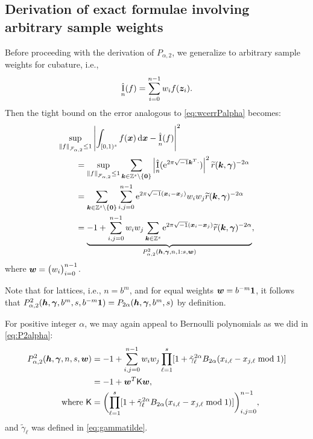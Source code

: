 \documentclass[authoryear]{elsarticle}
\newcommand{\tr}{\widetilde{r}}
\newcommand{\appxintn}{\appxint_n}
\DeclareMathOperator{\appxint}{\hat{I}}
\begin{document}
\subsection{Derivation of exact formulae involving arbitrary sample weights}
Before proceeding with the derivation of $P_{\alpha,2}$, we generalize to arbitrary sample weights for cubature, i.e., 
\[
\appxintn(f) =  \sum_{i=0}^{n-1} w_if(\vz_i).
\]
Then the tight bound on the error analogous to \eqref{eq:wcerrPalpha} becomes: 
\begin{align*}
\nonumber
\MoveEqLeft{\sup_{\norm[\cf_{\alpha,2}]{f} \le 1} \abs{\int_{[0,1)^{s}} f(\vx) \, \dif \vx - \appxint_n(f)}^2} \\
& = \sup_{\norm[\cf_{\alpha,2}]{f} \le 1} \sum_{\vk \in \integers^s \setminus\{\vzero\}} \abs{\appxint_n(\me^{2 \pi \sqrt{-1} \vk^T \cdot})}^2\tr(\vk,\vgamma)^{-2\alpha} \\
&=\sum_{\vk \in \integers^s \setminus\{\vzero\}} \sum_{i,j = 0}^{n-1} \me^{2 \pi \sqrt{-1} (\vx_i - \vx_j)} w_i w_j \tr(\vk,\vgamma)^{-2\alpha} \\
&= \underbrace{ -1 + \sum_{i,j = 0}^{n-1} w_i w_j \sum_{\vk \in \integers^s} \me^{2 \pi \sqrt{-1} (\vx_i - \vx_j)} \tr(\vk,\vgamma)^{-2\alpha}}_{P_{\alpha,2}^2(\vh,\vgamma,n,1:s, \vw)},
\end{align*}
where $\boldsymbol{w} = \bigl( w_i \bigr)_{i=0}^{n-1}$. 


Note that for lattices, i.e., $n=b^m$, and for equal weights $\boldsymbol{w} = b^{-m} \boldsymbol{1} $, it follows that $P_{\alpha,2}^2(\boldsymbol{h},\boldsymbol{\gamma},b^m,s, b^{-m} \boldsymbol{1}) = P_{2\alpha}(\boldsymbol{h},\boldsymbol{\gamma},b^m,s)$ by definition.


For positive integer $\alpha$, we may again appeal to Bernoulli polynomials as we did in \eqref{eq:P2alpha}:
\begin{align*}
\nonumber
P_{\alpha,2}^2(\boldsymbol{h},\boldsymbol{\gamma},n,s, \boldsymbol{w})
& = -1 + \sum_{i,j = 0}^{n-1} w_i w_j  
\prod_{\ell = 1}^s [1 + \tilde{\gamma}_{\ell}^{2\alpha}B_{2\alpha}(x_{i,\ell} - x_{j, \ell}\bmod 1)] \\
& = - 1 + \boldsymbol{w}^T \mathsf{K} \boldsymbol{w}, \\
\text{where } \mathsf{K}  & = \biggl( \prod_{\ell = 1}^s [1 + \tilde{\gamma}_{\ell}^{2 \alpha}B_{2\alpha}(x_{i,\ell} - x_{j, \ell} \bmod 1 )]\biggr)_{i,j=0}^{n-1} ,
\end{align*}
and $\tilde{\gamma}_{\ell}$ was defined in \eqref{eq:gammatilde}.
\end{document}
